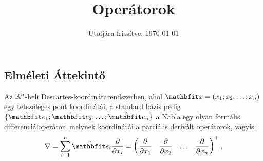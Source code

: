 \documentclass{szb-practice}
\title{Operátorok}
\date{Utoljára frissítve: \today}
\begin{document}
\maketitle

\vspace{-1em}
\subsection{Elméleti Áttekintő}
\vspace{1em}

\begin{definition}
  Az $\mathbb{R}^n$-beli Descartes-koordinátarendszerben, ahol $\rvec x = (x_1;
    x_2; \dots; x_n)$ egy tetszőleges pont koordinátái, a standard bázis pedig
  $\{ \uvec e_1; \uvec e_2; \dots; \uvec e_n \}$ a Nabla egy olyan formális
  differenciáloperátor, melynek koordinátái a parciális derivált operátorok,
  vagyis:
  $$
    \nabla = \sum_{i = 1}^n \uvec e_i \pdv{}{x_i}
    =
    \begin{pmatrix}
      \displaystyle\pdv{}{x_1} &
      \displaystyle\pdv{}{x_2} &
      \hdots                   &
      \displaystyle\pdv{}{x_n}
    \end{pmatrix}^\T
    \text,
  $$
\end{definition}
\end{document}

